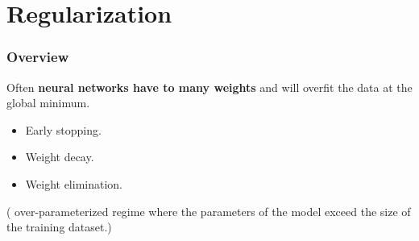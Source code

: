 \section{Regularization}

\begin{frame}
    \frametitle{Overview}
    Often \textbf{neural networks have to many weights} and will overfit the data at 
    the global minimum.
    
    \begin{itemize}
        \item Early stopping.
        \item Weight decay. 
        \item Weight elimination.
    \end{itemize}
    \cite{AUniversalLawofRobustness} 
    ( over-parameterized regime where the parameters of
     the model exceed the size of the training dataset.)
\end{frame}

